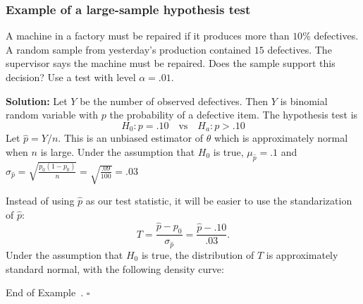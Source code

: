 \documentclass[10pt]{article}
\theoremstyle{definition}
\newtheorem{example}[theorem]{Example}
\renewenvironment{example}
{\begin{oldexample}}
  {\par\smallskip\hfill   End of Example~\theexample. $\square$    \par\end{oldexample}}
\newcommand{\vt}{\vskip 5mm} %
\newcommand{\Fl}{\vt\noindent\textbf} %
\newcommand{\1}[1]{\textbf{1}_{\left[#1\right]}} %
\begin{document}
\subsubsection{Example of a large-sample hypothesis test}
\begin{example}[Example 10.6 in textbook]
  \label{ex:example-10.6-textbook}
  A machine in a factory must be repaired if it produces more than $10\%$
  defectives. A random sample from yesterday's production contained $15$
  defectives. The supervisor says the machine must be repaired. Does the
  sample support this decision? Use a test with level $\alpha=.01$.

  \Fl{Solution:} Let $Y$ be the number of observed defectives. Then $Y$ is
  binomial random variable with $p$ the probability of a defective item.  The
  hypothesis test is
  \begin{equation*}
    H_{0}: p=.10 \quad \text{vs} \quad H_{a}: p>.10
  \end{equation*}
  Let $\widehat{p} = Y/n$. This is an unbiased estimator of $\theta$ which is
  approximately normal when $n$ is large. Under the assumption that $H_{0}$ is
  true, $\mu_{\widehat{p}} = .1$ and
  $\sigma_{\widehat{p}}= \sqrt{\frac{p_{0}(1-p_{0})}{n}}=
  \sqrt{\frac{.09}{100}}=.03$

  Instead of using $\widehat{p}$ as our test statistic, it will be easier to
  use the standarization of $\widehat{p}$:
  \begin{equation*}
    T = \frac{\widehat{p}-p_{0}}{\sigma_{\widehat{p}}} = \frac{\widehat{p}-.10}{.03}.
  \end{equation*}
  Under the assumption that $H_{0}$ is true, the distribution of $T$ is
  approximately standard normal, with the following density curve:

  \begin{center}
\end{center}
\end{example}
\end{document}
